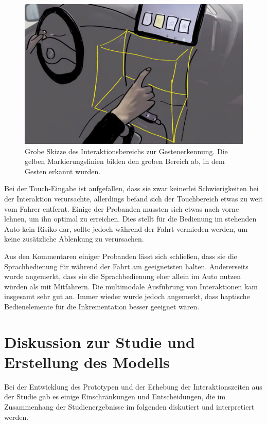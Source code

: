 \begin{figure}
	\centering
		\includegraphics[width=1\textwidth]{img/GestenbereichSkizze2.jpg}
	\caption[Skizze des Interaktionsbereichs zur Gestenerkennung]{Grobe Skizze des Interaktionsbereichs zur Gestenerkennung. Die gelben Markierungslinien bilden den groben Bereich ab, in dem Gesten erkannt wurden.}
	\label{fig:GestenbereichSkizze}
\end{figure}

Bei der Touch-Eingabe ist aufgefallen, dass sie zwar keinerlei Schwierigkeiten bei der Interaktion verursachte, allerdings befand sich der Touchbereich etwas zu weit vom Fahrer entfernt.
Einige der Probanden mussten sich etwas nach vorne lehnen, um ihn optimal zu erreichen.
Dies stellt für die Bedienung im stehenden Auto kein Risiko dar, sollte jedoch während der Fahrt vermieden werden, um keine zusätzliche Ablenkung zu verursachen.

Aus den Kommentaren einiger Probanden lässt sich schließen, dass sie die Sprachbedienung für während der Fahrt am geeignetsten halten.
Andererseits wurde angemerkt, dass sie die Sprachbedienung eher allein im Auto nutzen würden als mit Mitfahrern.
Die multimodale Ausführung von Interaktionen kam insgesamt sehr gut an.
Immer wieder wurde jedoch angemerkt, dass haptische Bedienelemente für die Inkrementation besser geeignet wären.

\clearpage
\section[Diskussion]{Diskussion zur Studie und Erstellung des Modells}
Bei der Entwicklung des Prototypen und der Erhebung der Interaktionszeiten aus der Studie gab es einige Einschränkungen und Entscheidungen, die im Zusammenhang der Studienergebnisse im folgenden diskutiert und interpretiert werden.

